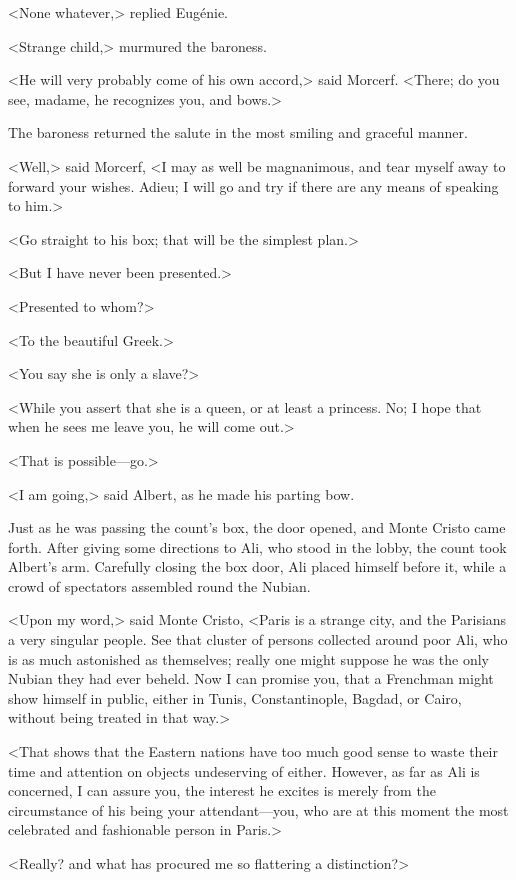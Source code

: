  <None whatever,> replied Eugénie. 

 <Strange child,> murmured the baroness. 

 <He will very probably come of his own accord,> said Morcerf. <There; do you see, madame, he recognizes you, and bows.> 

 The baroness returned the salute in the most smiling and graceful manner. 

 <Well,> said Morcerf, <I may as well be magnanimous, and tear myself away to forward your wishes. Adieu; I will go and try if there are any means of speaking to him.> 

 <Go straight to his box; that will be the simplest plan.> 

 <But I have never been presented.> 

 <Presented to whom?> 

 <To the beautiful Greek.> 

 <You say she is only a slave?> 

 <While you assert that she is a queen, or at least a princess. No; I hope that when he sees me leave you, he will come out.> 

 <That is possible—go.> 

 <I am going,> said Albert, as he made his parting bow. 

 Just as he was passing the count's box, the door opened, and Monte Cristo came forth. After giving some directions to Ali, who stood in the lobby, the count took Albert's arm. Carefully closing the box door, Ali placed himself before it, while a crowd of spectators assembled round the Nubian. 

 <Upon my word,> said Monte Cristo, <Paris is a strange city, and the Parisians a very singular people. See that cluster of persons collected around poor Ali, who is as much astonished as themselves; really one might suppose he was the only Nubian they had ever beheld. Now I can promise you, that a Frenchman might show himself in public, either in Tunis, Constantinople, Bagdad, or Cairo, without being treated in that way.> 

 <That shows that the Eastern nations have too much good sense to waste their time and attention on objects undeserving of either. However, as far as Ali is concerned, I can assure you, the interest he excites is merely from the circumstance of his being your attendant—you, who are at this moment the most celebrated and fashionable person in Paris.> 

 <Really? and what has procured me so flattering a distinction?> 

